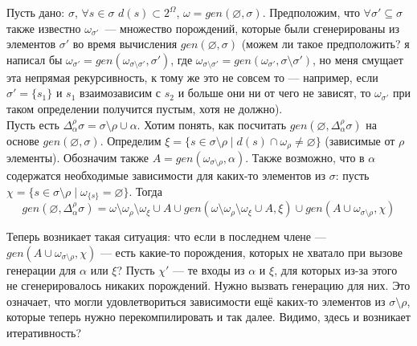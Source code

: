 



\newcommand{\Deltasigma}{\Delta_\alpha^\rho\sigma}

Пусть дано: $\sigma$, $\forall s \in \sigma$ $d(s) \subset 2^\Omega$, $\omega = gen(\varnothing, \sigma)$. Предположим, что $\forall \sigma' \subseteq \sigma$ также известно $\omega_{\sigma'}$~--- множество порождений, которые были сгенерированы из элементов $\sigma'$ во время вычисления $gen(\varnothing, \sigma)$ (можем ли такое предположить? я написал бы $\omega_{\sigma'} = gen(\omega_{\sigma\setminus\sigma'}, \sigma')$, где $\omega_{\sigma\setminus\sigma'} = gen(\omega_{\sigma'}, \sigma\setminus\sigma')$, но меня смущает эта непрямая рекурсивность, к тому же это не совсем то --- например, если $\sigma'=\{s_1\}$ и $s_1$ взаимозависим с $s_2$ и больше они ни от чего не зависят, то $\omega_{\sigma'}$ при таком определении получится пустым, хотя не должно).\\

Пусть есть $\Deltasigma = \sigma\setminus\rho\cup\alpha$. Хотим понять, как посчитать $gen(\varnothing, \Deltasigma)$ на основе $gen(\varnothing, \sigma)$. Определим $\xi = \{s \in \sigma\setminus\rho \mid d(s) \cap \omega_\rho \neq \varnothing\}$ (зависимые от $\rho$ элементы). Обозначим также $A = gen(\omega_{\sigma\setminus\rho}, \alpha)$. Также возможно, что в $\alpha$ содержатся необходимые зависимости для каких-то элементов из $\sigma$: пусть $\chi = \{s \in \sigma\setminus\rho \mid \omega_{\{s\}} = \varnothing\}$. Тогда
$$gen(\varnothing, \Deltasigma) = \omega \setminus \omega_\rho \setminus \omega_\xi \cup A \cup gen(\omega \setminus \omega_\rho \setminus \omega_\xi \cup A, \xi) \cup gen(A \cup \omega_{\sigma\setminus\rho}, \chi)$$

Теперь возникает такая ситуация: что если в последнем члене --- $gen(A \cup \omega_{\sigma\setminus\rho}, \chi)$ --- есть какие-то порождения, которых не хватало при вызове генерации для $\alpha$ или $\xi$? Пусть $\chi'$ --- те входы из $\alpha$ и $\xi$, для которых из-за этого не сгенерировалось никаких порождений. Нужно вызвать генерацию для них. Это означает, что могли удовлетвориться зависимости ещё каких-то элементов из $\sigma\setminus\rho$, которые теперь нужно перекомпилировать и так далее. Видимо, здесь и возникает итеративность?

